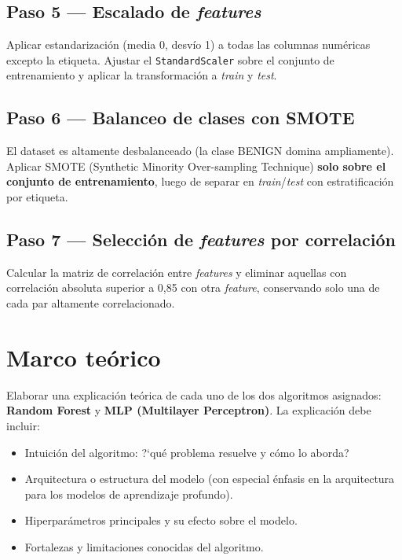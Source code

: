 \documentclass[11pt,a4paper]{article}
\newcommand{\codigo}[1]{\texttt{#1}}
\begin{document}
\subsection*{Paso 5 --- Escalado de \textit{features}}
Aplicar estandarizaci\'on (media 0, desv\'io 1) a todas las columnas num\'ericas excepto la etiqueta. Ajustar el \codigo{StandardScaler} sobre el conjunto de entrenamiento y aplicar la transformaci\'on a \textit{train} y \textit{test}.

\subsection*{Paso 6 --- Balanceo de clases con SMOTE}
El dataset es altamente desbalanceado (la clase BENIGN domina ampliamente). Aplicar SMOTE (Synthetic Minority Over-sampling Technique) \textbf{solo sobre el conjunto de entrenamiento}, luego de separar en \textit{train}/\textit{test} con estratificaci\'on por etiqueta.

\subsection*{Paso 7 --- Selecci\'on de \textit{features} por correlaci\'on}
Calcular la matriz de correlaci\'on entre \textit{features} y eliminar aquellas con correlaci\'on absoluta superior a 0,85 con otra \textit{feature}, conservando solo una de cada par altamente correlacionado.

\section{Marco te\'orico}
Elaborar una explicaci\'on te\'orica de cada uno de los dos algoritmos asignados: \textbf{Random Forest} y \textbf{MLP (Multilayer Perceptron)}. La explicaci\'on debe incluir:
\begin{itemize}[leftmargin=2em,itemsep=2pt]
    \item Intuici\'on del algoritmo: ?`qu\'e problema resuelve y c\'omo lo aborda?
    \item Arquitectura o estructura del modelo (con especial \'enfasis en la arquitectura para los modelos de aprendizaje profundo).
    \item Hiperpar\'ametros principales y su efecto sobre el modelo.
    \item Fortalezas y limitaciones conocidas del algoritmo.
\end{itemize}
\end{document}
